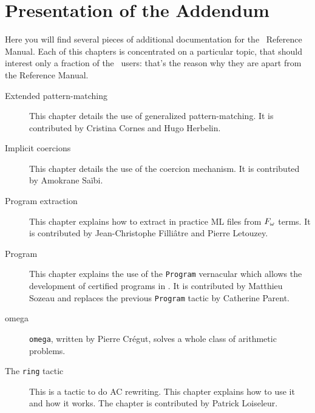 \chapter*{Presentation of the Addendum}

Here you will find several pieces of additional documentation for the
\Coq\ Reference Manual. Each of this chapters is concentrated on a
particular topic, that should interest only a fraction of the \Coq\
users: that's the reason why they are apart from the Reference
Manual.

\begin{description}

\item[Extended pattern-matching] This chapter details the use of
  generalized pattern-matching. It is contributed by Cristina Cornes
  and Hugo Herbelin.

\item[Implicit coercions] This chapter details the use of the coercion
  mechanism.  It is contributed by Amokrane Saïbi.


\item[Program extraction] This chapter explains how to extract in practice ML
  files from $F_{\omega}$ terms.   It is contributed by Jean-Christophe
  Filliâtre and Pierre Letouzey.

\item[Program] This chapter explains the use of the \texttt{Program}
  vernacular which allows the development of certified
  programs in \Coq. It is contributed by Matthieu Sozeau and replaces
  the previous \texttt{Program} tactic by Catherine Parent.


\item[omega] \texttt{omega}, written by Pierre Crégut, solves a whole
  class of arithmetic problems.

\item[The {\tt ring} tactic] This is a tactic to do AC rewriting. This
  chapter explains how to use it and how it works.
  The chapter is contributed by Patrick Loiseleur.


\end{description}
